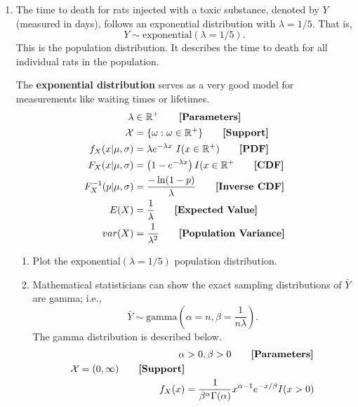 \documentclass{article}\usepackage[]{graphicx}\usepackage[]{color}
\begin{document}
\begin{enumerate}
\begin{enumerate}
	\end{enumerate}
\newpage
\item The time to death for rats injected with a toxic substance, denoted by $Y$
	(measured in days), follows an exponential distribution with $\lambda = 1/5$. That is,
	\[Y \sim \textrm{exponential}(\lambda = 1/5).\]
	This is the population distribution. It describes the time to death for all individual rats in the population.

  The \textbf{exponential distribution} serves as a very good model for measurements like waiting times or lifetimes.
  \begin{align*}
  \lambda &\in \mathbb{R^+}  \tag*{\textbf{[Parameters]}}\\
  \mathcal{X}&= \{\omega: \omega \in \mathbb{R^+}\} \tag*{\textbf{[Support]}}\\
  f_X(x|\mu,\sigma) &= \lambda e^{-\lambda x}~ I(x \in \mathbb{R^+}) \tag*{\textbf{[PDF]}}\\
  F_X(x|\mu,\sigma) &= \left(1- e^{-\lambda x}\right)I(x \in \mathbb{R^+}\tag*{\textbf{[CDF]}}\\
  F_X^{-1}(p|\mu,\sigma) &= \frac{-\ln(1-p)}{\lambda} \tag*{\textbf{[Inverse CDF]}}\\
  E(X) &= \frac{1}{\lambda} \tag*{\textbf{[Expected Value]}}\\
  var(X) &= \frac{1}{\lambda^2}\tag*{\textbf{[Population Variance]}}\\
  \end{align*}
	\begin{enumerate}
	  \item Plot the exponential$(\lambda = 1/5)$ population distribution.
	  \item Mathematical statisticians can show the exact sampling distributions 
	  of $\bar{Y}$ are gamma; i.e.,
	  \[\bar{Y} \sim \textrm{gamma}(\alpha=n,\beta=\frac{1}{n\lambda}).\]
	  The gamma distribution is described below.
\begin{align*}
\alpha &> 0, \beta>0 \tag*{\textbf{[Parameters]}}\\
\mathcal{X} = (0, \infty)\tag*{\textbf{[Support]}}\\
f_X(x) &= \frac{1}{\beta^\alpha \Gamma(\alpha)} x^{\alpha-1} e^{-x/\beta} I(x>0)

\end{align*}
\end{enumerate}
\end{enumerate}
\end{document}

